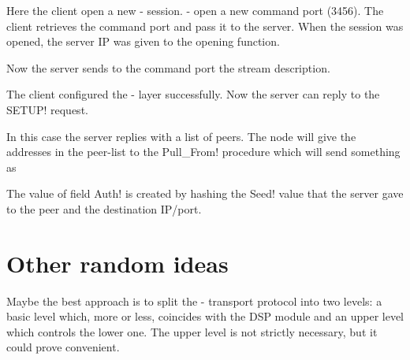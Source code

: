 \documentclass{article}
\begin{document}
Here the client open a new \medusa- session.  \medusa- open a new
command port (3456).  The client retrieves the command port and pass
it to the server.  When the session was opened, the server IP was
given to the opening function.


Now the server sends to the command port the stream description.


The client configured the \medusa- layer successfully.  Now the server
can reply to the \ttt SETUP! request.


In this case the server replies with a list of peers.  The node will
give the addresses in the peer-list to the \ttt Pull_From! procedure
which will send something as


The value of field \ttt Auth! is created by hashing the \ttt Seed!
value that the server gave to the peer and the destination IP/port. 

\section{Other random ideas}
\label{sect:2;transport_layer}

Maybe the best approach is to split the \medusa- transport protocol
into two levels: a basic level which, more or less, coincides with the
DSP module and an upper level which controls the lower one.  The upper
level is not strictly necessary, but it could prove convenient.
\end{document}
